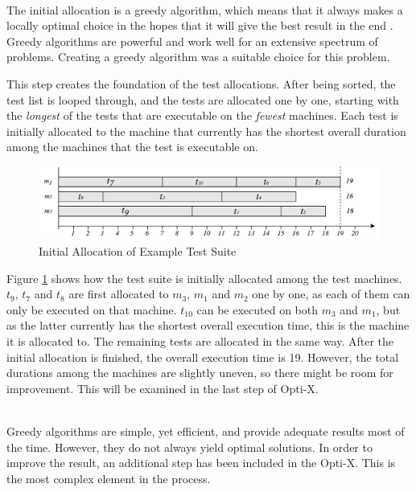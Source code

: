 \vspace{7px}
\noindent \textbf{}\\
\noindent The initial allocation is a greedy algorithm, which means that it always makes a locally optimal choice in the hopes that it will give the best result in the end \cite{Algorithms}. Greedy algorithms are powerful and work well for an extensive spectrum of problems. Creating a greedy algorithm was a suitable choice for this problem.

This step creates the foundation of the test allocations. After being sorted, the test list is looped through, and the tests are allocated one by one, starting with the \emph{longest} of the tests that are executable on the \emph{fewest} machines. Each test is initially allocated to the machine that currently has the shortest overall duration among the machines that the test is executable on.

\begin{figure}[h]
    \centering
    \includegraphics[width=\textwidth]{figures/new/initial_allocation2.pdf}
    \caption{Initial Allocation of Example Test Suite}
    \label{fig.initial_allocation}
\end{figure}

Figure \ref{fig.initial_allocation} shows how the test suite is initially allocated among the test machines. $t_{9}$, $t_{7}$ and $t_{8}$ are first allocated to $m_{3}$, $m_{1}$ and $m_{2}$ one by one, as each of them can only be executed on that machine. $t_{10}$ can be executed on both $m_{3}$ and $m_{1}$, but as the latter currently has the shortest overall execution time, this is the machine it is allocated to. The remaining tests are allocated in the same way. After the initial allocation is finished, the overall execution time is 19. However, the total durations among the machines are slightly uneven, so there might be room for improvement. This will be examined in the last step of Opti-X.






\vspace{7px}
\noindent \textbf{}\\
\noindent Greedy algorithms are simple, yet efficient, and provide adequate results most of the time. However, they do not always yield optimal solutions. In order to improve the result, an additional step has been included in the Opti-X. This is the most complex element in the process.

